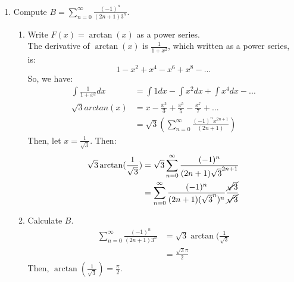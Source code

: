 \documentclass{article}
\begin{document}
\begin{enumerate}
    \item Compute $B = \sum_{n=0}^\infty \frac{(-1)^n}{(2n+1)3^n}$.
    \begin{enumerate}
        \item Write $F(x) = \arctan(x)$ as a power series.\\
        The derivative of $\arctan(x)$ is $\frac{1}{1+x^2}$, which written as a power series, is:
        $$1 - x^2 + x^4 - x^6 + x^8 - ...$$
        So, we have:
        \begin{align*}
            \int \frac{1}{1+x^2} dx & = \int 1 dx - \int x^2 dx + \int x^4 dx - ...\\
            \sqrt{3}arctan(x) & = x - \frac{x^3}{3} + \frac{x^5}{5} - \frac{x^7}{7} + ...\\
            & = \sqrt{3} \left( \sum_{n=0}^\infty \frac{(-1)^n x^{2n+1}}{(2n+1)}\right)
        \end{align*}
        Then, let $x = \frac{1}{\sqrt{3}}$. Then:
        \begin{align*}
            \sqrt{3}\arctan(\frac{1}{\sqrt{3}}) & = \sqrt{3} \sum_{n=0}^\infty \frac{(-1)^n}{(2n+1)\sqrt{3}^{2n+1}}\\
            & = \sum_{n=0}^\infty \frac{(-1)^n}{(2n+1)(\sqrt{3}^n)^n} \frac{\cancel{\sqrt{3}}}{\cancel{\sqrt{3}}}
        \end{align*}
        \item Calculate $B$.
        \begin{align*}
            \sum_{n=0}^\infty \frac{(-1)^n}{(2n+1)3^n} & = \sqrt{3} \arctan(\frac{1}{\sqrt{3}}\\
            & = \frac{\sqrt{3}{\pi}}{2}
        \end{align*}
        Then, $\arctan(\frac{1}{\sqrt{3}}) = \frac{\pi}{2}$.
    \end{enumerate}
\end{enumerate}
\end{document}
